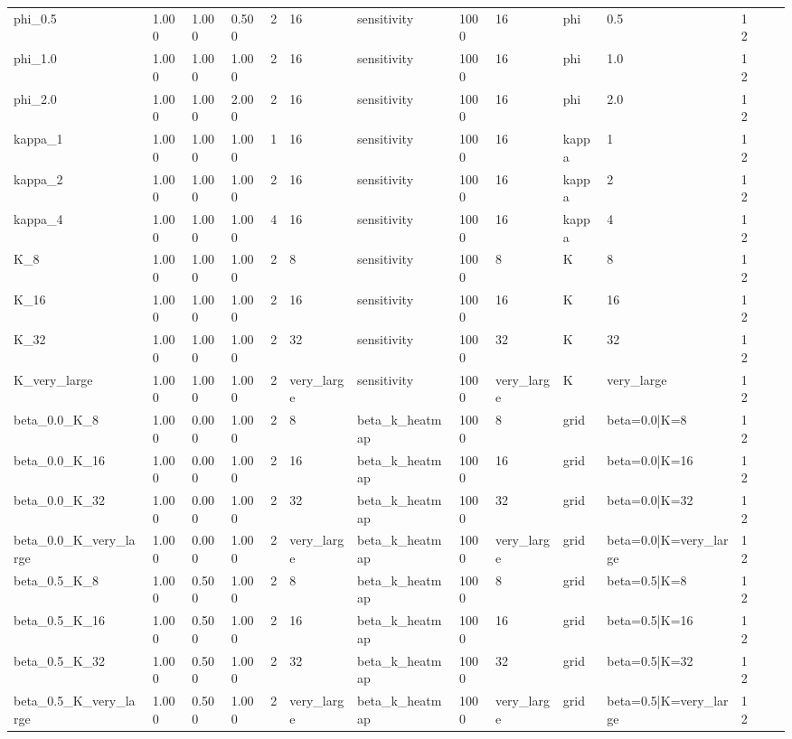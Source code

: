 \begin{tabular}{llllllllllllll}
phi\_0.5 & 1.000 & 1.000 & 0.500 & 2 & 16 & sensitivity & 1000 & 16 & phi & 0.5 & 12 &  &  \\
phi\_1.0 & 1.000 & 1.000 & 1.000 & 2 & 16 & sensitivity & 1000 & 16 & phi & 1.0 & 12 &  &  \\
phi\_2.0 & 1.000 & 1.000 & 2.000 & 2 & 16 & sensitivity & 1000 & 16 & phi & 2.0 & 12 &  &  \\
kappa\_1 & 1.000 & 1.000 & 1.000 & 1 & 16 & sensitivity & 1000 & 16 & kappa & 1 & 12 &  &  \\
kappa\_2 & 1.000 & 1.000 & 1.000 & 2 & 16 & sensitivity & 1000 & 16 & kappa & 2 & 12 &  &  \\
kappa\_4 & 1.000 & 1.000 & 1.000 & 4 & 16 & sensitivity & 1000 & 16 & kappa & 4 & 12 &  &  \\
K\_8 & 1.000 & 1.000 & 1.000 & 2 & 8 & sensitivity & 1000 & 8 & K & 8 & 12 &  &  \\
K\_16 & 1.000 & 1.000 & 1.000 & 2 & 16 & sensitivity & 1000 & 16 & K & 16 & 12 &  &  \\
K\_32 & 1.000 & 1.000 & 1.000 & 2 & 32 & sensitivity & 1000 & 32 & K & 32 & 12 &  &  \\
K\_very\_large & 1.000 & 1.000 & 1.000 & 2 & very\_large & sensitivity & 1000 & very\_large & K & very\_large & 12 &  &  \\
beta\_0.0\_K\_8 & 1.000 & 0.000 & 1.000 & 2 & 8 & beta\_k\_heatmap & 1000 & 8 & grid & beta=0.0|K=8 & 12 &  &  \\
beta\_0.0\_K\_16 & 1.000 & 0.000 & 1.000 & 2 & 16 & beta\_k\_heatmap & 1000 & 16 & grid & beta=0.0|K=16 & 12 &  &  \\
beta\_0.0\_K\_32 & 1.000 & 0.000 & 1.000 & 2 & 32 & beta\_k\_heatmap & 1000 & 32 & grid & beta=0.0|K=32 & 12 &  &  \\
beta\_0.0\_K\_very\_large & 1.000 & 0.000 & 1.000 & 2 & very\_large & beta\_k\_heatmap & 1000 & very\_large & grid & beta=0.0|K=very\_large & 12 &  &  \\
beta\_0.5\_K\_8 & 1.000 & 0.500 & 1.000 & 2 & 8 & beta\_k\_heatmap & 1000 & 8 & grid & beta=0.5|K=8 & 12 &  &  \\
beta\_0.5\_K\_16 & 1.000 & 0.500 & 1.000 & 2 & 16 & beta\_k\_heatmap & 1000 & 16 & grid & beta=0.5|K=16 & 12 &  &  \\
beta\_0.5\_K\_32 & 1.000 & 0.500 & 1.000 & 2 & 32 & beta\_k\_heatmap & 1000 & 32 & grid & beta=0.5|K=32 & 12 &  &  \\
beta\_0.5\_K\_very\_large & 1.000 & 0.500 & 1.000 & 2 & very\_large & beta\_k\_heatmap & 1000 & very\_large & grid & beta=0.5|K=very\_large & 12 &  &  \\

\end{tabular}
